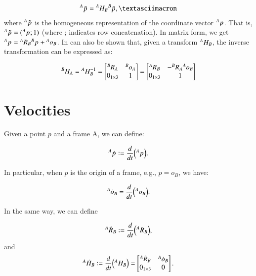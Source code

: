\[
\leftsuperscript{A}{\tilde{p}}{} = \leftsuperscript{A}{H}{B} \leftsuperscript{B}{\tilde{p}}{}, ¯
\]
where ${}^{A}{\tilde{p}}_{}$ is the homogeneous representation of the coordinate vector ${}^{A}{p}_{}$. That is, ${}^{A}{\tilde{p}}_{} = ({}^{A}{p}_{}; 1)$ (where ; indicates row concatenation). In matrix form, we get ${}^{A}{p}_{} = {}^{A}{R}_{B} {}^{B}{p}_{} + {}^{A}{o}_{B}$.
In can also be shown that, given a transform ${}^{A}{H}_{B}$, the inverse transformation can be expressed as:

\begin{equation}
    {}^{B}{H}_{A} = {}^{A}{H}_{B}^{-1} = \begin{bmatrix}
    {}^{B}{R}_{A} & {}^{B}{o}_{A} \\
    0_{1\times 3} & 1
\end{bmatrix} = \begin{bmatrix}
    {}^{A}{R}_{B} & -{}^{B}{R}_{A}{}^{A}{o}_{B} \\
    0_{1\times 3} & 1
\end{bmatrix}
\end{equation}


\section{Velocities}
Given a point $p$ and a frame A, we can define:

\begin{equation}
    {}^{A}{\dot{p}}_{} \vcentcolon= \frac{d}{dt} \Big({}^{A}{p}_{} \Big).
\end{equation}

In particular, when $p$ is the origin of a frame, e.g., $p = o_B$, we have:

\[
{}^{A}{\dot{o}}_{B} = \frac{d}{dt} \Big({}^{A}{o}_{B} \Big).
\]

In the same way, we can define

\begin{equation}
    {}^{A}{\dot{R}}_{B} \vcentcolon= \frac{d}{dt} \Big({}^{A}{R}_{B} \Big),
\end{equation}
and
\begin{equation}
    {}^{A}{\dot{H}}_{B} \vcentcolon= \frac{d}{dt} \Big({}^{A}{H}_{B} \Big) = 
    \begin{bmatrix}
    {}^{A}{\dot{R}}_{B} & {}^{A}{\dot{o}}_{B} \\
    0_{1\times 3} & 0
    \end{bmatrix}.
\end{equation}

